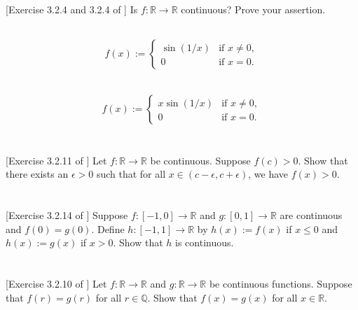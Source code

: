 \documentclass[11pt,letterpaper]{article}
\begin{document}
\section{} [Exercise 3.2.4 and 3.2.4 of \cite{Lebl_23}] 
Is $f: \mathbb{R}\to \mathbb{R}$ continuous? Prove your assertion.

\subsection{}
\begin{align}
    f(x) := \begin{cases}
        \sin(1/x) &\text{if } x\neq 0,\\
        0  &\text{if } x= 0.
    \end{cases}
\end{align}

\subsection{}
\begin{align}
    f(x) := \begin{cases}
        x\sin(1/x) &\text{if } x\neq 0,\\
        0  &\text{if } x= 0.
    \end{cases}
\end{align}

\section{} [Exercise 3.2.11 of \cite{Lebl_23}] 
Let $f:\mathbb{R}\to \mathbb{R}$ be continuous. Suppose $f(c)>0$. Show that there exists an $\epsilon>0$ such
that for all $x\in(c-\epsilon,c+\epsilon)$, we have $f(x)>0$.

\section{} [Exercise 3.2.14 of \cite{Lebl_23}] 
Suppose $f:[-1,0]\to \mathbb{R}$ and $g:[0,1]\to \mathbb{R}$ are continuous and $f(0)=g(0)$. Define $h:[-1,1]\to \mathbb{R}$ by $h(x) := f(x)$ if $x\leq 0$ and $h(x):= g(x)$ if $x>0$. Show that $h$ is continuous.

\section{} [Exercise 3.2.10 of \cite{Lebl_23}] 
Let $f:\mathbb{R}\to \mathbb{R}$ and $g:\mathbb{R}\to \mathbb{R}$ be continuous functions. Suppose that $f(r)=g(r)$ for all $r\in\mathbb{Q}$. Show that $f(x)=g(x)$ for all $x\in\mathbb{R}$. 
\end{document}
